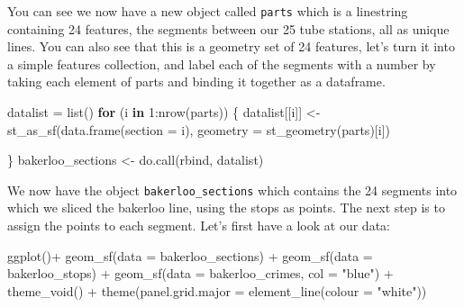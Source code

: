 \documentclass[
  krantz2]{krantz}
\makeatletter
\newenvironment{Shaded}{\begin{snugshade}}{\end{snugshade}}
\newcommand{\AttributeTok}[1]{\textcolor[rgb]{0.61,0.61,0.61}{#1}}
\newcommand{\ControlFlowTok}[1]{\textcolor[rgb]{0.27,0.27,0.27}{\textbf{#1}}}
\newcommand{\DecValTok}[1]{\textcolor[rgb]{0.06,0.06,0.06}{#1}}
\newcommand{\FunctionTok}[1]{\textcolor[rgb]{0,0,0}{#1}}
\newcommand{\NormalTok}[1]{#1}
\newcommand{\OtherTok}[1]{\textcolor[rgb]{0.37,0.37,0.37}{#1}}
\newcommand{\SpecialCharTok}[1]{\textcolor[rgb]{0,0,0}{#1}}
\newcommand{\StringTok}[1]{\textcolor[rgb]{0.5,0.5,0.5}{#1}}
\newenvironment{kframe}{%
\medskip{}
\setlength{\fboxsep}{.8em}
 \def\at@end@of@kframe{}%
 \ifinner\ifhmode%
  \def\at@end@of@kframe{\end{minipage}}%
  \begin{minipage}{\columnwidth}%
 \fi\fi%
 \def\FrameCommand##1{\hskip\@totalleftmargin \hskip-\fboxsep
 \colorbox{shadecolor}{##1}\hskip-\fboxsep
     \hskip-\linewidth \hskip-\@totalleftmargin \hskip\columnwidth}%
 \MakeFramed {\advance\hsize-\width
   \@totalleftmargin\z@ \linewidth\hsize
   \@setminipage}}%
 {\par\unskip\endMakeFramed%
 \at@end@of@kframe}
\renewenvironment{Shaded}{\begin{kframe}}{\end{kframe}}
\makeatother
\begin{document}
\begin{Shaded}
\end{Shaded}

You can see we now have a new object called \texttt{parts} which is a linestring containing 24 features, the segments between our 25 tube stations, all as unique lines. You can also see that this is a geometry set of 24 features, let's turn it into a simple features collection, and label each of the segments with a number by taking each element of parts and binding it together as a dataframe.

\begin{Shaded}
\begin{Highlighting}[]
\NormalTok{datalist }\OtherTok{=} \FunctionTok{list}\NormalTok{()}
\ControlFlowTok{for}\NormalTok{ (i }\ControlFlowTok{in} \DecValTok{1}\SpecialCharTok{:}\FunctionTok{nrow}\NormalTok{(parts)) \{}
\NormalTok{  datalist[[i]] }\OtherTok{\textless{}{-}} \FunctionTok{st\_as\_sf}\NormalTok{(}\FunctionTok{data.frame}\NormalTok{(}\AttributeTok{section =}\NormalTok{ i), }
                            \AttributeTok{geometry =} \FunctionTok{st\_geometry}\NormalTok{(parts)[i])}
  
\NormalTok{\}}
\NormalTok{bakerloo\_sections }\OtherTok{\textless{}{-}} \FunctionTok{do.call}\NormalTok{(rbind, datalist)}
\end{Highlighting}
\end{Shaded}

We now have the object \texttt{bakerloo\_sections} which contains the 24 segments into which we sliced the bakerloo line, using the stops as points. The next step is to assign the points to each segment. Let's first have a look at our data:

\begin{Shaded}
\begin{Highlighting}[]
\FunctionTok{ggplot}\NormalTok{()}\SpecialCharTok{+} 
  \FunctionTok{geom\_sf}\NormalTok{(}\AttributeTok{data =}\NormalTok{ bakerloo\_sections) }\SpecialCharTok{+} 
  \FunctionTok{geom\_sf}\NormalTok{(}\AttributeTok{data =}\NormalTok{ bakerloo\_stops) }\SpecialCharTok{+} 
  \FunctionTok{geom\_sf}\NormalTok{(}\AttributeTok{data =}\NormalTok{ bakerloo\_crimes, }\AttributeTok{col =} \StringTok{"blue"}\NormalTok{) }\SpecialCharTok{+} 
  \FunctionTok{theme\_void}\NormalTok{() }\SpecialCharTok{+} 
  \FunctionTok{theme}\NormalTok{(}\AttributeTok{panel.grid.major =} \FunctionTok{element\_line}\NormalTok{(}\AttributeTok{colour =} \StringTok{"white"}\NormalTok{))}
\end{Highlighting}
\end{Shaded}
\end{document}
